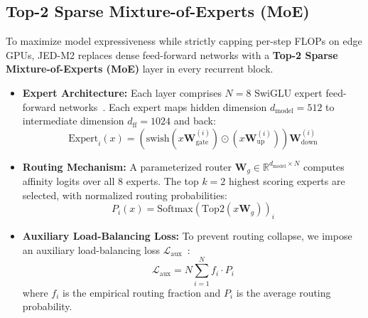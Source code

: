 \documentclass[10pt,twocolumn,letterpaper]{article}
\begin{document}
\subsection{Top-2 Sparse Mixture-of-Experts (MoE)}

To maximize model expressiveness while strictly capping per-step FLOPs on edge GPUs, JED-M2 replaces dense feed-forward networks with a \textbf{Top-2 Sparse Mixture-of-Experts (MoE)} layer in every recurrent block.
\begin{itemize}[leftmargin=*]
    \item \textbf{Expert Architecture:} Each layer comprises $N=8$ SwiGLU expert feed-forward networks~\cite{shazeer2020glu}. Each expert maps hidden dimension $d_{\text{model}} = 512$ to intermediate dimension $d_{\text{ff}} = 1024$ and back:
    \begin{equation}
    \text{Expert}_i(x) = \left( \text{swish}(x \mathbf{W}_{\text{gate}}^{(i)}) \odot (x \mathbf{W}_{\text{up}}^{(i)}) \right) \mathbf{W}_{\text{down}}^{(i)}
    \end{equation}
    \item \textbf{Routing Mechanism:} A parameterized router $\mathbf{W}_g \in \mathbb{R}^{d_{\text{model}} \times N}$ computes affinity logits over all 8 experts. The top $k=2$ highest scoring experts are selected, with normalized routing probabilities:
    \begin{equation}
    P_i(x) = \text{Softmax}(\text{Top2}(x \mathbf{W}_g))_i
    \end{equation}
    \item \textbf{Auxiliary Load-Balancing Loss:} To prevent routing collapse, we impose an auxiliary load-balancing loss $\mathcal{L}_{\text{aux}}$~\cite{fedus2022switch}:
    \begin{equation}
    \mathcal{L}_{\text{aux}} = N \sum_{i=1}^N f_i \cdot P_i
    \end{equation}
    where $f_i$ is the empirical routing fraction and $P_i$ is the average routing probability.
\end{itemize}
\end{document}
